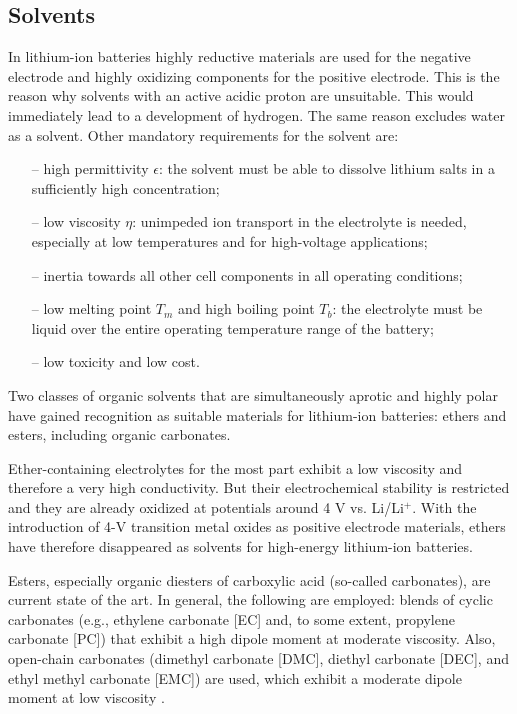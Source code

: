 \subsection{Solvents}
\label{sec:solvents}
In lithium-ion batteries highly reductive materials are used for the negative electrode and highly oxidizing components for the positive electrode. This is the reason why solvents with an active acidic proton are unsuitable. This would immediately lead to a development of hydrogen. The same reason excludes water as a solvent. Other mandatory requirements for the solvent are:
\begin{itemize}
    \item[--] high permittivity $\epsilon$: the solvent must be able to dissolve lithium salts in a sufficiently high concentration;
    \item[--] low viscosity $\eta$: unimpeded ion transport in the electrolyte is needed, especially at low temperatures and for high-voltage applications;
    \item[--] inertia towards all other cell components in all operating conditions;
    \item[--] low melting point $T_m$ and high boiling point $T_b$: the electrolyte must be liquid over the entire operating temperature range of the battery;
    \item[--] low toxicity and low cost.
\end{itemize}

Two classes of organic solvents that are simultaneously aprotic and highly polar have gained recognition as suitable materials for lithium-ion batteries: ethers and esters, including organic carbonates.

Ether-containing electrolytes for the most part exhibit a low viscosity and therefore a very high conductivity. But their electrochemical stability is restricted and they are already oxidized at potentials around 4 V vs. Li/Li$^+$. With the introduction of 4-V transition metal oxides as positive electrode materials, ethers have therefore disappeared as solvents for high-energy lithium-ion batteries.

Esters, especially organic diesters of carboxylic acid (so-called carbonates), are current state of the art. In general, the following are employed: blends of cyclic carbonates (e.g., ethylene carbonate [EC] and, to some extent, propylene carbonate [PC]) that exhibit a high dipole moment at moderate viscosity. Also, open-chain carbonates (dimethyl carbonate [DMC], diethyl carbonate [DEC], and ethyl methyl carbonate [EMC]) are used, which exhibit a moderate dipole moment at low viscosity \cite{xu2004nonaqueous,aurbach1995study,song1999review}.


